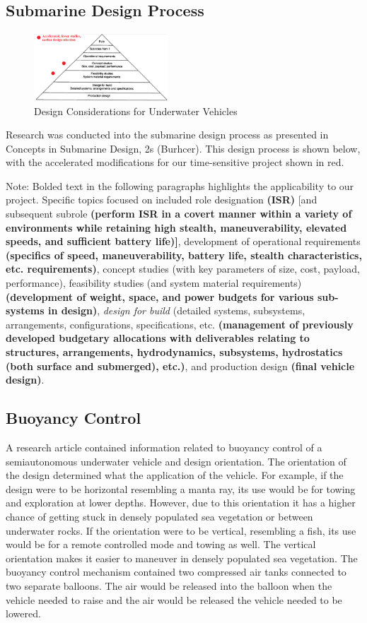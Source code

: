 \documentclass{report}
\begin{document}
\subsection{Submarine Design Process}
\begin{figure}[h]
\centering
\includegraphics[width=5cm]{"Submarine Design"}
\caption{Design Considerations for Underwater Vehicles}
\end{figure}
Research was conducted into the submarine design process as presented in Concepts in Submarine Design, 2s (Burhcer).  This design process is shown below, with the accelerated modifications for our time-sensitive project shown in red.\par
Note: Bolded text in the following paragraphs highlights the applicability to our project. Specific topics focused on included  role designation \textbf{(ISR)} [and subsequent subrole \textbf{(perform ISR in a covert manner within a variety of environments while retaining high stealth, maneuverability, elevated speeds, and sufficient battery life)]}, development of operational requirements \textbf{(specifics of speed, maneuverability, battery life, stealth characteristics, etc. requirements)}, concept studies (with key parameters of size, cost, payload, performance), feasibility studies (and system material requirements) \textbf{(development of weight, space, and power budgets for various sub-systems in design)}, \textit{design for build} (detailed systems, subsystems, arrangements, configurations, specifications, etc. \textbf{(management of previously developed budgetary allocations with deliverables relating to structures, arrangements, hydrodynamics, subsystems, hydrostatics (both surface and submerged), etc.)}, and production design \textbf{(final vehicle design)}.
\subsection{Buoyancy Control}
A research article contained information related to buoyancy control of a semiautonomous underwater vehicle and design orientation. The orientation of the design determined what the application of the vehicle. For example, if the design were to be horizontal resembling a manta ray, its use would be for towing and exploration at lower depths. However, due to this orientation it has a higher chance of getting stuck in densely populated sea vegetation or between underwater rocks. If the orientation were to be vertical, resembling a fish, its use would be for a remote controlled mode and towing as well. The vertical orientation makes it easier to maneuver in densely populated sea vegetation. The buoyancy control mechanism contained two compressed air tanks connected to two separate balloons. The air would be released into the balloon when the vehicle needed to raise and the air would be released the vehicle needed to be lowered.
\end{document}
